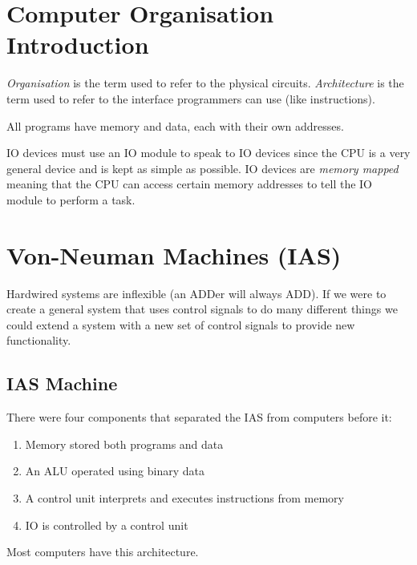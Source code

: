 \section{Computer Organisation Introduction}\label{sec:computer_organisation_introduction}

\emph{Organisation} is the term used to refer to the physical circuits.
\emph{Architecture} is the term used to refer to the interface programmers can use (like instructions).

All programs have memory and data, each with their own addresses.

IO devices must use an IO module to speak to IO devices since the CPU is a very general device and is kept as simple as possible.
IO devices are \emph{memory mapped} meaning that the CPU can access certain memory addresses to tell the IO module to perform a task.

\section{Von-Neuman Machines (IAS)}\label{sec:von_neuman_machines_ias_}

Hardwired systems are inflexible (an ADDer will always ADD).
If we were to create a general system that uses control signals to do many different things we could extend a system with a new set of control signals to provide new functionality.

\subsection{IAS Machine}\label{sub:ias_machine}

There were four components that separated the IAS from computers before it:
\begin{enumerate}
	\item Memory stored both programs and data
	\item An ALU operated using binary data
	\item A control unit interprets and executes instructions from memory
	\item IO is controlled by a control unit
\end{enumerate}
%
Most computers have this architecture.


